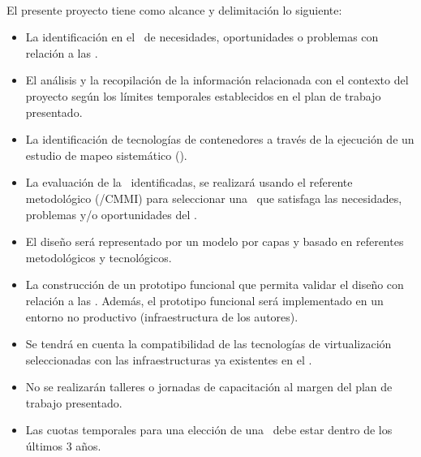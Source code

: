 \label{cap:alcance}
\mbox{}\\
\noindent
El presente proyecto tiene como alcance y delimitación lo siguiente:

\begin{itemize}
    \item La identificación en el \GRID\ de necesidades, oportunidades o problemas con relación a las \VBC.
    \item El análisis y la recopilación de la información relacionada con el contexto del proyecto según los límites temporales establecidos en el plan de trabajo presentado.
    \item La identificación de tecnologías de contenedores a través de la ejecución de un estudio de mapeo sistemático (\SMS).
    \item La evaluación de la \VBC\ identificadas, se realizará usando el referente metodológico (\DAR/CMMI) para seleccionar una \VBC\ que satisfaga las necesidades, problemas y/o oportunidades del \GRID.
    \item El diseño será representado por un modelo por capas y basado en referentes metodológicos y tecnológicos.
    \item La construcción de un prototipo funcional que permita validar el diseño con relación a las \VBC. Además, el prototipo funcional será implementado en un entorno no productivo (infraestructura de los autores).
    \item Se tendrá en cuenta la compatibilidad de las tecnologías de virtualización seleccionadas con las infraestructuras ya existentes en el \GRID.
    \item No se realizarán talleres o jornadas de capacitación al margen del plan de trabajo presentado.
    \item Las cuotas temporales para una elección de una \VBC\ debe estar dentro de los últimos 3 años.
\end{itemize}